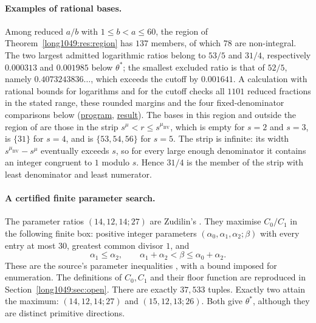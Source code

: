 \documentclass[11pt]{article}
\begin{document}
\paragraph{Examples of rational bases.}
Among reduced $a/b$ with $1\le b<a\le60$, the region of
Theorem~\ref{long1049:res:region} has $137$ members, of which $78$ are
non-integral. The two largest admitted logarithmic ratios belong to
$53/5$ and $31/4$, respectively $0.000313$ and $0.001985$ below
$\theta^*$; the smallest excluded ratio is that of $52/5$, namely
$0.4073243836\ldots$, which exceeds the cutoff by $0.001641$.
A calculation with rational bounds for logarithms and for the cutoff
checks all $1101$ reduced fractions in the stated range, these rounded
margins and the four fixed-denominator comparisons below
(\href{https://github.com/wcook04/plectis-erdos/blob/4beca4ad0c00a626def9c73f2420e20ebf8d1968/research/experiments/erdos1049/rational_base_examples.py}{program}, \href{https://github.com/wcook04/plectis-erdos/blob/4beca4ad0c00a626def9c73f2420e20ebf8d1968/research/experiments/erdos1049/receipts/rational-base-examples.json}{result}). The
bases in this region and outside the region of \cite{bv1994} are those in the strip
$s^{\mu}<r\le s^{\mu_{\mathrm{BV}}}$, which is empty for $s=2$ and $s=3$, is
$\{31\}$ for $s=4$, and is $\{53,54,56\}$ for $s=5$.  The strip is infinite:
its width $s^{\mu_{\mathrm{BV}}}-s^{\mu}$ eventually exceeds $s$, so for every
large enough denominator it contains an integer congruent to $1$ modulo $s$.
Hence $31/4$ is the member of the strip with least denominator and least numerator.

\paragraph{A certified finite parameter search.}
The parameter ratios $(14,12,14;27)$ are Zudilin's \cite[p.~162]{zudilin2004}.
They maximise $C_0/C_1$ in the following finite box: positive integer
parameters $(\alpha_0,\alpha_1,\alpha_2;\beta)$ with every entry at most
$30$, greatest common divisor $1$, and
\[
 \alpha_1\le\alpha_2,\qquad
 \alpha_1+\alpha_2<\beta\le\alpha_0+\alpha_2.
\]
These are the source's parameter inequalities
\cite[Sec.~5, p.~161]{zudilin2004}, with a bound imposed for enumeration.
The definitions of $C_0,C_1$ and their floor function are reproduced in
Section~\ref{long1049:sec:open}. There are exactly $37{,}533$ tuples.
Exactly two attain the maximum: $(14,12,14;27)$ and $(15,12,13;26)$.
Both give $\theta^*$, although they are distinct primitive directions.
\end{document}
